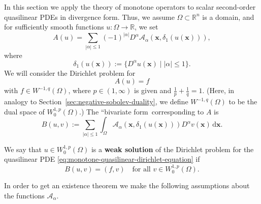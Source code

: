 In this section we apply the theory of monotone operators to scalar second-order quasilinear PDEs in divergence form. Thus, we assume $\Omega\subset\mathbb{R}^n$ is a domain, and for sufficiently smooth functions $u:\Omega\to\mathbb{R}$, we set
\begin{equation}\label{eq:monotone-quasilinear-divergence-operator}
A(u)=\sum_{|\alpha|\leq1}(-1)^{|\alpha|}D^\alpha\mathcal{A}_\alpha(\bm{x},\delta_1(u(\bm{x}))),
\end{equation}
where
\begin{equation}\label{eq:monotone-quasilinear-first-derivative-jet}
\delta_1(u(\bm{x})):=\{D^\alpha u(\bm{x})\mid|\alpha|\leq1\}.
\end{equation}
We will consider the Dirichlet problem for
\begin{equation}\label{eq:monotone-quasilinear-dirichlet-equation}
A(u)=f
\end{equation}
with $f\in W^{-1,q}(\Omega)$, where $p\in(1,\infty)$ is given and $\frac{1}{p}+\frac{1}{q}=1$. (Here, in analogy to Section~\ref{sec:negative-sobolev-duality}, we define $W^{-1,q}(\Omega)$ to be the dual space of $W_0^{1,p}(\Omega)$.) The ``bivariate form\textquotesingle\textquotesingle\ corresponding to $A$ is
\begin{equation}\label{eq:monotone-quasilinear-bivariate-form}
B(u,v):=\sum_{|\alpha|\leq1}\int_\Omega\mathcal{A}_\alpha(\bm{x},\delta_1(u(\bm{x})))D^\alpha v(\bm{x})\,\mathrm{d}\bm{x}.
\end{equation}


\begin{Definition}
\label{def:monotone-quasilinear-dirichlet-weak-solution}
We say that $u\in W_0^{1,p}(\Omega)$ is a \textbf{weak solution} of the Dirichlet problem for the quasilinear PDE \eqref{eq:monotone-quasilinear-dirichlet-equation} if
\begin{equation}\label{eq:monotone-quasilinear-dirichlet-weak-formulation}
B(u,v)=(f,v)\quad\text{for all }v\in W_0^{1,p}(\Omega).
\end{equation}

\end{Definition}

In order to get an existence theorem we make the following assumptions about the functions $\mathcal{A}_\alpha$.

